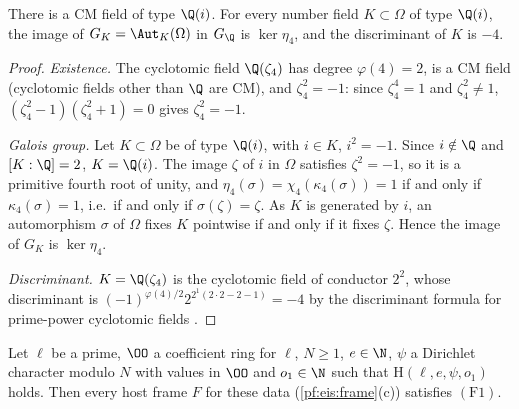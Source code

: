 \begin{proposition}\label{pf:sh-misc:gauss}
There is a CM field of type $\Q(i)$. For every number field $K\subset\Omega$ of type $\Q(i)$, the image of $G_K=\Aut_K(\Omega)$ in $G_\Q$ is
$\ker\eta_4$, and the discriminant of $K$ is $-4$.
\end{proposition}

\begin{proof}
\emph{Existence.} The cyclotomic field $\Q(\zeta_4)$ has degree $\varphi(4)=2$, is a CM field (cyclotomic fields other than $\Q$ are
CM), and $\zeta_4^2=-1$: since $\zeta_4^4=1$ and $\zeta_4^2\ne1$, $(\zeta_4^2-1)(\zeta_4^2+1)=0$ gives $\zeta_4^2=-1$.

\emph{Galois group.} Let $K\subset\Omega$ be of type $\Q(i)$, with $i\in K$, $i^2=-1$. Since $i\notin\Q$ and $[K:\Q]=2$, $K=\Q(i)$. The image
$\zeta$ of $i$ in $\Omega$ satisfies $\zeta^2=-1$, so it is a primitive fourth root of unity, and $\eta_4(\sigma)=\chi_4(\kappa_4(\sigma))=1$
if and only if $\kappa_4(\sigma)=1$, i.e.\ if and only if $\sigma(\zeta)=\zeta$. As $K$ is generated by $i$, an automorphism $\sigma$ of $\Omega$
fixes $K$ pointwise if and only if it fixes $\zeta$. Hence the image of $G_K$ is $\ker\eta_4$.

\emph{Discriminant.} $K=\Q(\zeta_4)$ is the cyclotomic field of conductor $2^2$, whose discriminant is
$(-1)^{\varphi(4)/2}2^{2^{1}(2\cdot2-2-1)}=-4$ by the discriminant formula for prime-power cyclotomic fields
\cite[Ch.~2]{Washington1997}.
\end{proof}

\begin{theorem}\label{pf:sh-misc:hostframe}
Let $\ell$ be a prime, $\OO$ a coefficient ring for $\ell$, $N\ge1$, $e\in\N$, $\psi$ a Dirichlet character modulo $N$ with values in $\OO$ and
$o_1\in\N$ such that $\mathrm{H}(\ell,e,\psi,o_1)$ holds. Then every host frame $F$ for these data (\cref{pf:eis:frame}(c)) satisfies
$(\mathrm{F1})$.
\end{theorem}

